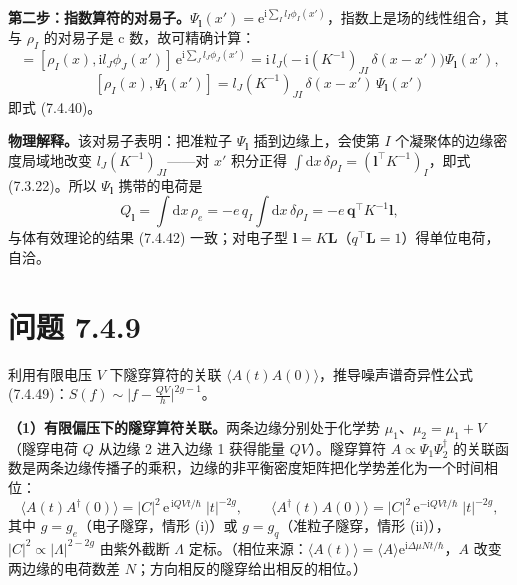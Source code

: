 \textbf{第二步：指数算符的对易子。}$\Psi_{\pmb{l}}(x')=\mathrm{e}^{\mathrm{i}\sum_Il_I\phi_I(x')}$，指数上是场的线性组合，其与 $\rho_I$ 的对易子是 c 数，故可精确计算：
\begin{equation*}
[\rho_I(x),\Psi_{\pmb{l}}(x')]
=[\rho_I(x),\mathrm{i}l_J\phi_J(x')]\,\mathrm{e}^{\mathrm{i}\sum_Jl_J\phi_J(x')}
=\mathrm{i}\,l_J\big(-\mathrm{i}(K^{-1})_{JI}\,\delta(x-x')\big)\Psi_{\pmb{l}}(x') ,
\end{equation*}
\begin{equation*}
\boxed{\;[\rho_I(x),\Psi_{\pmb{l}}(x')]
=l_J(K^{-1})_{JI}\,\delta(x-x')\,\Psi_{\pmb{l}}(x')\;}
\end{equation*}
即式 (7.4.40)。

\textbf{物理解释。}该对易子表明：把准粒子 $\Psi_{\pmb{l}}$ 插到边缘上，会使第 $I$ 个凝聚体的边缘密度局域地改变 $l_J(K^{-1})_{JI}$——对 $x'$ 积分正得 $\int\mathrm{d}x\,\delta\rho_I=(\pmb{l}^{\top}K^{-1})_I$，即式 (7.3.22)。所以 $\Psi_{\pmb{l}}$ 携带的电荷是
\begin{equation*}
Q_{\pmb{l}}=\int\mathrm{d}x\,\rho_e=-e\,q_I\!\int\!\mathrm{d}x\,\delta\rho_I
=-e\,\pmb{q}^{\top}K^{-1}\pmb{l},
\end{equation*}
与体有效理论的结果 (7.4.42) 一致；对电子型 $\pmb{l}=K\pmb{L}$（$q^{\top}\pmb{L}=1$）得单位电荷，自洽。

\section*{问题 7.4.9}
\begin{problem}
利用有限电压 $V$ 下隧穿算符的关联 $\langle A(t)A(0)\rangle$，推导噪声谱奇异性公式 (7.4.49)：$S(f)\sim\big|f-\frac{QV}{h}\big|^{2g-1}$。
\end{problem}
\solution
\textbf{（1）有限偏压下的隧穿算符关联。}两条边缘分别处于化学势 $\mu_1$、$\mu_2=\mu_1+V$（隧穿电荷 $Q$ 从边缘 2 进入边缘 1 获得能量 $QV$）。隧穿算符 $A\propto\Psi_{1}\Psi_{2}^{\dagger}$ 的关联函数是两条边缘传播子的乘积，边缘的非平衡密度矩阵把化学势差化为一个时间相位：
\begin{equation*}
\langle A(t)A^{\dagger}(0)\rangle
=|C|^2\,\mathrm{e}^{\,\mathrm{i}QVt/\hbar}\;|t|^{-2g},
\qquad
\langle A^{\dagger}(t)A(0)\rangle
=|C|^2\,\mathrm{e}^{-\mathrm{i}QVt/\hbar}\;|t|^{-2g},
\end{equation*}
其中 $g=g_e$（电子隧穿，情形 (i)）或 $g=g_q$（准粒子隧穿，情形 (ii)），$|C|^2\propto|\Lambda|^{2-2g}$ 由紫外截断 $\Lambda$ 定标。（相位来源：$\langle A(t)\rangle=\langle A\rangle\mathrm{e}^{\mathrm{i}\Delta\mu Nt/\hbar}$，$A$ 改变两边缘的电荷数差 $N$；方向相反的隧穿给出相反的相位。）

